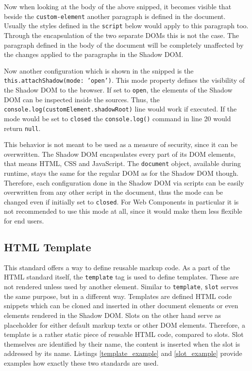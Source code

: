 Now when looking at the body of the above snipped, it becomes visible that beside the \texttt{custom-element} another paragraph is defined in the document. Usually the styles defined in the \texttt{script} below would apply to this paragraph too. Through the encapsulation of the two separate DOMs this is not the case. The paragraph defined in the body of the document will be completely unaffected by the changes applied to the paragraphs in the Shadow DOM.\cite{simon_thesis}

Now another configuration which is shown in the snipped is the \texttt{this.attachShadow({mode: 'open'})}. This mode property defines the visibility of the Shadow DOM to the browser. If set to \texttt{open}, the elements of the Shadow DOM can be inspected inside the sources. Thus, the \texttt{console.log(customElement.shadowRoot)} line would work if executed. 
If the mode would be set to \texttt{closed}  the \texttt{console.log()} command in line 20 would return \texttt{null}.\cite{simon_thesis}

This behavior is not meant to be used as a measure of security, since it can be overwritten. The Shadow DOM encapsulates every part of its DOM elements, that means HTML, CSS and JavaScript. The \texttt{document} object, available during runtime, stays the same for the regular DOM as for the Shadow DOM though. Therefore, each configuration done in the Shadow DOM via scripts can be easily overwritten from any other script in the document, thus the mode can be changed even if initially set to \texttt{closed}.\cite{shadow_dom_encapsulation} For Web Components in particular it is not recommended to use this mode at all, since it would make them less flexible for end users.\cite{wc_shadow_dom_google}

\subsection{HTML Template}

This standard offers a way to define reusable markup code. As a part of the HTML standard itself, the \texttt{template} tag is used to define templates. These are not rendered unless used by another element. Similar to \texttt{template}, \texttt{slot} serves the same purpose, but in a different way. Templates are defined HTML code snippets which can be cloned and inserted in other document elements or even elements rendered in the Shadow DOM.
Slots on the other hand serve as placeholder for either default markup texts or other DOM elements. Therefore, a template is a rather static piece of reusable HTML code, compared to slots.
Slot themselves are identified by their name, the content is inserted when the slot is addressed by its name.
Listings \ref{template_example} and \ref{slot_example} provide examples how exactly these two standards are used. \cite{wc_html_template_slots}

